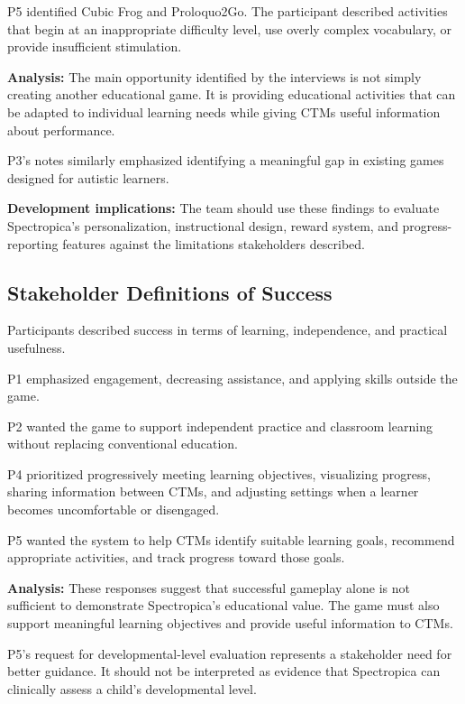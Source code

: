 \documentclass[12pt, titlepage]{article}
\begin{document}
P5 identified Cubic Frog and Proloquo2Go. The participant described activities that begin at an inappropriate difficulty level, use overly complex vocabulary, or provide insufficient stimulation.

\noindent\textbf{Analysis:} The main opportunity identified by the interviews is not simply creating another educational game. It is providing educational activities that can be adapted to individual learning needs while giving CTMs useful information about performance.

P3's notes similarly emphasized identifying a meaningful gap in existing games designed for autistic learners.

\noindent\textbf{Development implications:} The team should use these findings to evaluate Spectropica's personalization, instructional design, reward system, and progress-reporting features against the limitations stakeholders described.

\subsection{Stakeholder Definitions of Success}

Participants described success in terms of learning, independence, and practical usefulness.

P1 emphasized engagement, decreasing assistance, and applying skills outside the game.

P2 wanted the game to support independent practice and classroom learning without replacing conventional education.

P4 prioritized progressively meeting learning objectives, visualizing progress, sharing information between CTMs, and adjusting settings when a learner becomes uncomfortable or disengaged.

P5 wanted the system to help CTMs identify suitable learning goals, recommend appropriate activities, and track progress toward those goals.

\noindent\textbf{Analysis:} These responses suggest that successful gameplay alone is not sufficient to demonstrate Spectropica's educational value. The game must also support meaningful learning objectives and provide useful information to CTMs.

P5's request for developmental-level evaluation represents a stakeholder need for better guidance. It should not be interpreted as evidence that Spectropica can clinically assess a child's developmental level.
\end{document}
